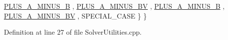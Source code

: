 \begin{DoxyCode}
      \hyperlink{namespaceocra_1_1utils_1_1details_a617d399055aa54cfdf2d3199ca91c399a4d0375804693ed7a4e1ff4e40b1d067b}{PLUS\_A\_MINUS\_B} , \hyperlink{namespaceocra_1_1utils_1_1details_a617d399055aa54cfdf2d3199ca91c399a78c37c659e4056c97d766ab9621e01ff}{PLUS\_A\_MINUS\_BV} , \hyperlink{namespaceocra_1_1utils_1_1details_a617d399055aa54cfdf2d3199ca91c399a4d0375804693ed7a4e1ff4e40b1d067b}{PLUS\_A\_MINUS\_B} , 
      \hyperlink{namespaceocra_1_1utils_1_1details_a617d399055aa54cfdf2d3199ca91c399a78c37c659e4056c97d766ab9621e01ff}{PLUS\_A\_MINUS\_BV} , SPECIAL\_CASE   \}
    \}
\end{DoxyCode}


Definition at line 27 of file Solver\+Utilities.\+cpp.

